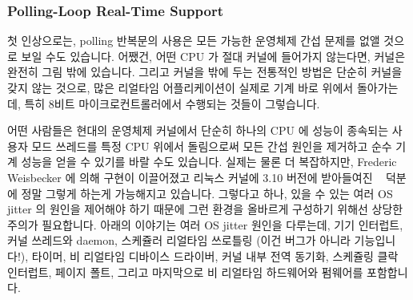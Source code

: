 \subsubsection{Polling-Loop Real-Time Support}
\label{sec:advsync:Polling-Loop Real-Time Support}

첫 인상으로는, polling 반복문의 사용은 모든 가능한 운영체제 간섭 문제를 없앨
것으로 보일 수도 있습니다.
어쨌건, 어떤 CPU 가 절대 커널에 들어가지 않는다면, 커널은 완전히 그림 밖에
있습니다.
그리고 커널을 밖에 두는 전통적인 방법은 단순히 커널을 갖지 않는 것으로, 많은
리얼타임 어플리케이션이 실제로 기계 바로 위에서 돌아가는데, 특히 8비트
마이크로컨트롤러에서 수행되는 것들이 그렇습니다.

어떤 사람들은 현대의 운영체제 커널에서 단순히 하나의 CPU 에 성능이 종속되는
사용자 모드 쓰레드를 특정 CPU 위에서 돌림으로써 모든 간섭 원인을 제거하고 순수
기계 성능을 얻을 수 있기를 바랄 수도 있습니다.
실제는 물론 더 복잡하지만, Frederic Weisbecker 에 의해 구현이 이끌어졌고 리눅스
커널에 3.10 버전에 받아들여진
~\cite{JonCorbet2013NO-HZ-FULL,FredericWeisbecker2013nohz}
덕분에 정말 그렇게 하는게 가능해지고 있습니다.
그렇다고 하나, 있을 수 있는 여러 OS jitter 의 원인을 제어해야 하기 때문에 그런
환경을 올바르게 구성하기 위해선 상당한 주의가 필요합니다.
아래의 이야기는 여러 OS jitter 원인을 다루는데, 기기 인터럽트, 커널 쓰레드와
daemon, 스케쥴러 리얼타임 쓰로틀링 (이건 버그가 아니라 기능입니다!), 타이머, 비
리얼타임 디바이스 드라이버, 커널 내부 전역 동기화, 스케쥴링 클락 인터럽트,
페이지 폴트, 그리고 마지막으로 비 리얼타임 하드웨어와 펌웨어를 포함합니다.

